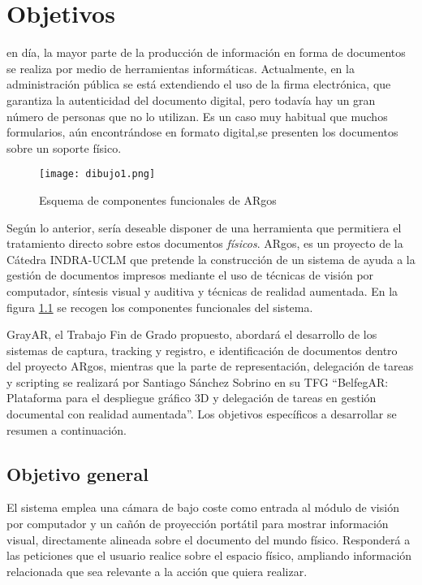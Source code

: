 \chapter{Objetivos}
\label{chap:objetivos}

 en día, la mayor parte de la producción de información en forma de documentos se realiza por medio de herramientas informáticas. Actualmente, en la administración pública se está extendiendo el uso de la firma electrónica, que garantiza la autenticidad del documento digital, pero todavía hay un gran número de personas que no lo utilizan. Es un caso muy habitual que muchos formularios, aún encontrándose en formato digital,se presenten los documentos sobre un soporte físico. %
\begin{figure}[h!]
  \begin{center}
      \texttt{[image: dibujo1.png]}
      \caption{Esquema de componentes funcionales de ARgos}
      \label{fig:diagrama_argos}
    \end{center}
\end{figure}
   
Según lo anterior, sería deseable disponer de una herramienta que permitiera el tratamiento directo sobre estos documentos \textit{físicos}.  ARgos, es un proyecto de la Cátedra INDRA-UCLM que pretende la construcción de un sistema de ayuda a la gestión de documentos impresos mediante el uso de técnicas de visión por computador, síntesis visual y auditiva y técnicas de realidad aumentada. En la figura \ref{fig:diagrama_argos} se recogen los componentes funcionales del sistema.


GrayAR, el Trabajo Fin de Grado propuesto, abordará el desarrollo de los sistemas de captura, tracking y registro, e identificación de documentos dentro del proyecto ARgos, mientras que la parte de representación, delegación de tareas y scripting se realizará por Santiago Sánchez Sobrino en su TFG ``BelfegAR: Plataforma para el despliegue gráfico 3D y delegación de tareas en gestión documental con realidad aumentada''. Los objetivos específicos a desarrollar se resumen a continuación.   

\section{Objetivo general}
El sistema emplea una cámara de bajo coste como entrada al módulo de visión por computador y un cañón de proyección portátil para mostrar información visual, directamente alineada sobre el documento del mundo físico. Responderá a las peticiones que el usuario realice sobre el espacio físico, ampliando información relacionada que sea relevante a la acción que quiera realizar.

